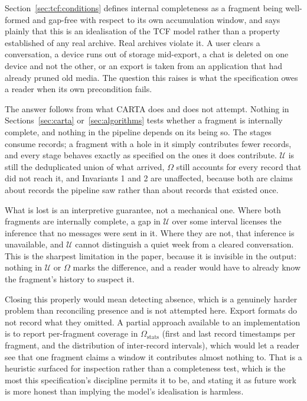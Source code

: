 Section~\ref{sec:tcf:conditions} defines internal completeness as a fragment
being well-formed and gap-free with respect to its own accumulation window, and
says plainly that this is an idealisation of the TCF model rather than a property
established of any real archive. Real archives violate it. A user clears a
conversation, a device runs out of storage mid-export, a chat is deleted on one
device and not the other, or an export is taken from an application that had
already pruned old media. The question this raises is what the specification owes
a reader when its own precondition fails.

The answer follows from what CARTA does and does not attempt. Nothing in
Sections~\ref{sec:carta} or~\ref{sec:algorithms} tests whether a fragment is
internally complete, and nothing in the pipeline depends on its being so. The
stages consume records; a fragment with a hole in it simply contributes fewer
records, and every stage behaves exactly as specified on the ones it does
contribute. $\mathcal{U}$ is still the deduplicated union of what arrived,
$\Omega$ still accounts for every record that did not reach it, and Invariants 1
and 2 are unaffected, because both are claims about records the pipeline saw
rather than about records that existed once.

What is lost is an interpretive guarantee, not a mechanical one. Where both
fragments are internally complete, a gap in $\mathcal{U}$ over some interval
licenses the inference that no messages were sent in it. Where they are not, that
inference is unavailable, and $\mathcal{U}$ cannot distinguish a quiet week from a
cleared conversation. This is the sharpest limitation in the paper, because it is
invisible in the output: nothing in $\mathcal{U}$ or $\Omega$ marks the
difference, and a reader would have to already know the fragment's history to
suspect it.

Closing this properly would mean detecting absence, which is a genuinely harder
problem than reconciling presence and is not attempted here. Export formats do
not record what they omitted. A partial approach available to an implementation
is to report per-fragment coverage in $\Omega_{\text{stats}}$ (first and last
record timestamps per fragment, and the distribution of inter-record intervals),
which would let a reader see that one fragment claims a window it contributes
almost nothing to. That is a heuristic surfaced for inspection rather than a
completeness test, which is the most this specification's discipline permits it to
be, and stating it as future work is more honest than implying the model's
idealisation is harmless.

